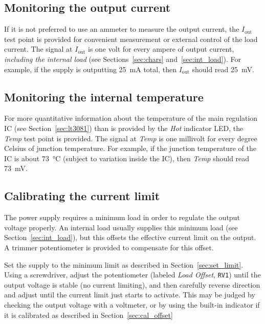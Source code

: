 \documentclass[letterpaper,twocolumn,11pt]{article}
\newcommand{\refdes}[1]{\texttt{#1}}
\begin{document}
\subsection{Monitoring the output current}

If it is not preferred to use an ammeter to measure the output current, the
\textit{$I_\text{out}$} test point is provided for convenient measurement or
external control of the load current. The signal at \textit{$I_\text{out}$}
is one volt for every ampere of output current, \emph{including the internal
load} (see Sections~\ref{sec:chars} and~\ref{sec:int_load}). For example, if the
supply is outputting \SI{25}{\mA} total, then \textit{$I_\text{out}$} should
read \SI{25}{\mV}.

\subsection{Monitoring the internal temperature}

For more quantitative information about the temperature of the main regulation
IC (see Section~\ref{sec:lt3081}) than is provided by the \textit{Hot} indicator
LED, the \textit{Temp} test point is provided. The signal at \textit{Temp} is
one millivolt for every degree Celsius of junction temperature. For example, if
the junction temperature of the IC is about \SI{73}{\celsius} (subject to
variation inside the IC), then \textit{Temp} should read \SI{73}{\mV}.

\subsection{Calibrating the current limit}

The power supply requires a minimum load in order to regulate the output voltage
properly. An internal load usually supplies this minimum load (see
Section~\ref{sec:int_load}), but this offsets the effective current limit on the
output. A trimmer potentiometer is provided to compensate for this offset.

Set the supply to the minimum limit as described in Section~\ref{sec:set_limit}.
Using a screwdriver, adjust the potentiometer (labeled \emph{Load
Offset}, \refdes{RV1}) until the output voltage is stable (no current limiting),
and then carefully reverse direction and adjust until the current limit just
starts to activate. This may be judged by checking the output voltage with a
voltmeter, or by using the built-in indicator if it is calibrated as described
in Section~\ref{sec:cal_offset}
\end{document}
